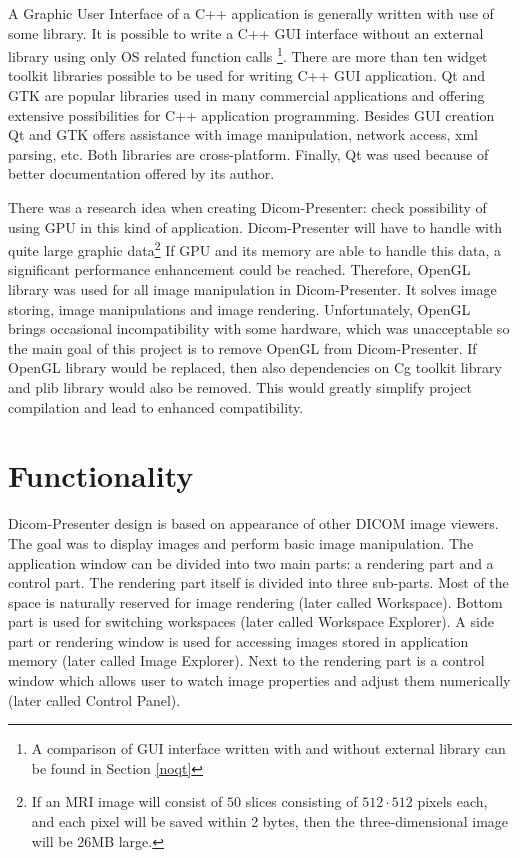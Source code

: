 A Graphic User Interface of a C++ application is generally written with use of some library. It is possible to write a C++ GUI interface without an external library using only OS related function calls \footnote{A comparison of GUI interface written with and without external library can be found in Section \ref{noqt}}. There are more than ten widget toolkit libraries possible to be used for writing C++ GUI application. Qt and GTK are popular libraries used in many commercial applications and offering extensive possibilities for C++ application programming\cite[pages~413-416]{qtvsgtk}. Besides GUI creation Qt and GTK offers assistance with image manipulation, network access, xml parsing, etc. Both libraries are cross-platform. Finally, Qt was used because of better documentation offered by its author.

There was a research idea when creating Dicom-Presenter: check possibility of using GPU in this kind of application. Dicom-Presenter will have to handle with quite large graphic data\footnote{If an MRI image will consist of $50$ slices consisting of $512 \cdot 512$ pixels each, and each pixel will be saved within 2 bytes, then the three-dimensional image will be 26MB large\cite[page~121]{mrioverall}.} If GPU and its memory are able to handle this data, a significant performance enhancement could be reached. Therefore, OpenGL library was used for all image manipulation in Dicom-Presenter. It solves image storing, image manipulations and image rendering. Unfortunately, OpenGL brings occasional incompatibility with some hardware, which was unacceptable so the main goal of this project is to remove OpenGL from Dicom-Presenter. If OpenGL library would be replaced, then also dependencies on Cg toolkit library and plib library would also be removed. This would greatly simplify project compilation and lead to enhanced compatibility.



\section{Functionality}
\label{dicom-presenter}
Dicom-Presenter design is based on appearance of other DICOM image viewers. The goal was to display images and perform basic image manipulation. The application window can be divided into two main parts: a rendering part and a control part. The rendering part itself is divided into three sub-parts. Most of the space is naturally reserved for image rendering (later called Workspace). Bottom part is used for switching workspaces (later called Workspace Explorer). A side part or rendering window is used for accessing images stored in application memory (later called Image Explorer). Next to the rendering part is a control window which allows user to watch image  properties and adjust them numerically (later called Control Panel). 

